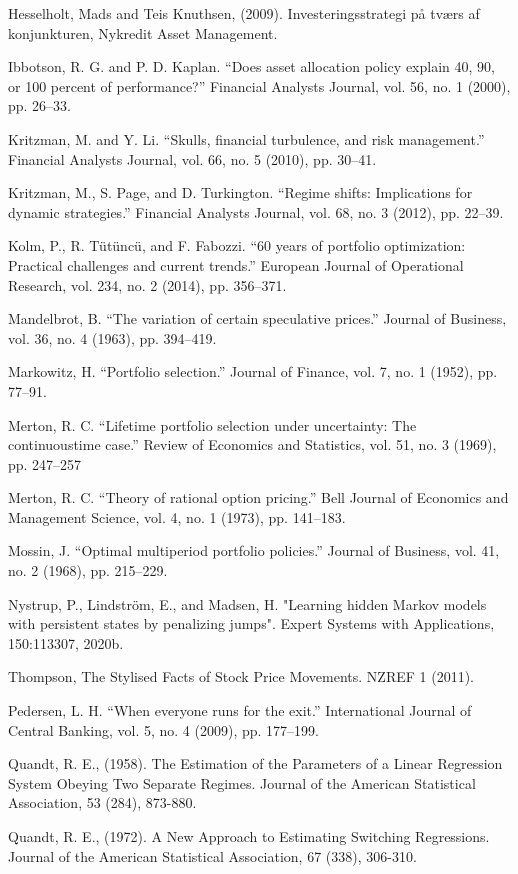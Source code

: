 Hesselholt, Mads and Teis Knuthsen, (2009). Investeringsstrategi på tværs af konjunkturen, Nykredit Asset Management.

Ibbotson, R. G. and P. D. Kaplan. “Does asset allocation policy explain 40, 90, or 100 percent of performance?” Financial Analysts Journal, vol. 56, no. 1 (2000), pp. 26–33.

Kritzman, M. and Y. Li. “Skulls, financial turbulence, and risk management.” Financial Analysts Journal, vol. 66, no. 5 (2010), pp. 30–41.

Kritzman, M., S. Page, and D. Turkington. “Regime shifts: Implications for dynamic strategies.” Financial Analysts Journal, vol. 68, no. 3 (2012), pp. 22–39.

Kolm, P., R. Tütüncü, and F. Fabozzi. “60 years of portfolio optimization: Practical challenges and current trends.” European Journal of Operational Research, vol. 234, no. 2 (2014), pp. 356–371.

Mandelbrot, B. “The variation of certain speculative prices.” Journal of Business, vol. 36, no. 4 (1963), pp. 394–419.

Markowitz, H. “Portfolio selection.” Journal of Finance, vol. 7, no. 1 (1952), pp. 77–91.

Merton, R. C. “Lifetime portfolio selection under uncertainty: The continuoustime case.” Review of Economics and Statistics, vol. 51, no. 3 (1969), pp. 247–257

Merton, R. C. “Theory of rational option pricing.” Bell Journal of Economics
and Management Science, vol. 4, no. 1 (1973), pp. 141–183.

Mossin, J. “Optimal multiperiod portfolio policies.” Journal of Business, vol. 41,
no. 2 (1968), pp. 215–229.

Nystrup, P., Lindström, E., and Madsen, H. "Learning hidden Markov models with persistent states by penalizing jumps". Expert Systems with Applications, 150:113307, 2020b.

Thompson, The Stylised Facts of Stock Price Movements. NZREF 1 (2011).

Pedersen, L. H. “When everyone runs for the exit.” International Journal of Central Banking, vol. 5, no. 4 (2009), pp. 177–199.

Quandt, R. E., (1958). The Estimation of the Parameters of a Linear Regression System Obeying Two Separate Regimes. Journal of the American Statistical Association, 53 (284), 873-880.

Quandt, R. E., (1972). A New Approach to Estimating Switching Regressions. Journal of the American
Statistical Association, 67 (338), 306-310.

